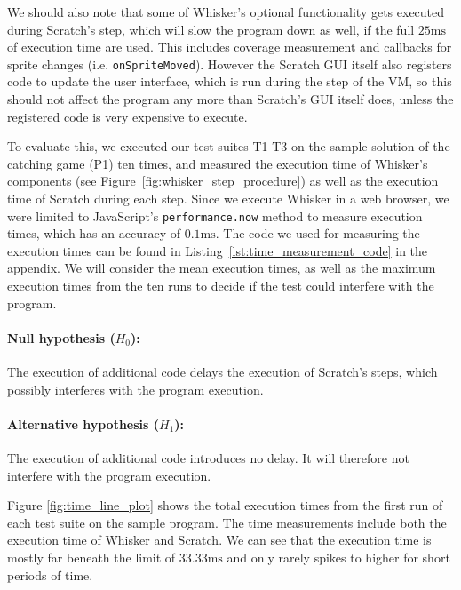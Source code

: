 We should also note that some of Whisker's optional functionality gets executed during Scratch's step,
which will slow the program down as well, if the full $25\text{ms}$ of execution time are used.
This includes coverage measurement and callbacks for sprite changes (i.e. \texttt{onSpriteMoved}).
However the Scratch GUI itself also registers code to update the user interface, which is run during the step of the VM,
so this should not affect the program any more than Scratch's GUI itself does,
unless the registered code is very expensive to execute.
\parspace

To evaluate this,
we executed our test suites T1-T3 on the sample solution of the catching game (P1) ten times,
and measured the execution time of Whisker's components (see Figure~\ref{fig:whisker_step_procedure})
as well as the execution time of Scratch during each step.
Since we execute Whisker in a web browser,
we were limited to JavaScript's \texttt{performance.now} method to measure execution times,
which has an accuracy of $0.1\text{ms}$.
The code we used for measuring the execution times can be found in Listing~\ref{lst:time_measurement_code} in the appendix.
We will consider the mean execution times, as well as the maximum execution times from the ten runs
to decide if the test could interfere with the program.

\clearpage

\paragraph{Null hypothesis ($H_0$):}
The execution of additional code delays the execution of Scratch's steps, which possibly interferes with the program execution.
\vspace{-\medskipamount}
\paragraph{Alternative hypothesis ($H_1$):}
The execution of additional code introduces no delay. It will therefore not interfere with the program execution.
\parspace

\noindent Figure \ref{fig:time_line_plot} shows the total execution times
from the first run of each test suite on the sample program.
The time measurements include both the execution time of Whisker and Scratch.
We can see that the execution time is mostly far beneath the limit of $33.33\text{ms}$
and only rarely spikes to higher for short periods of time.
\parspace

